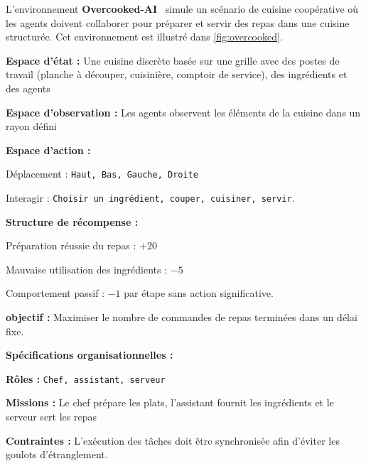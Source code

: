 L'environnement \textbf{Overcooked-AI}~\cite{Carroll2019} simule un scénario de cuisine coopérative où les agents doivent collaborer pour préparer et servir des repas dans une cuisine structurée. Cet environnement est illustré dans \autoref{fig:overcooked}.

\begin{enumerate*}[label={\roman*)}, itemjoin={; \quad}]
    \item \textbf{Espace d'état :} Une cuisine discrète basée sur une grille avec des postes de travail (planche à découper, cuisinière, comptoir de service), des ingrédients et des agents
    \item \textbf{Espace d'observation :} Les agents observent les éléments de la cuisine dans un rayon défini
    \item \textbf{Espace d'action :}
    \begin{enumerate*}[label={\roman*)}, itemjoin={; \quad}]
        \item Déplacement : \texttt{Haut, Bas, Gauche, Droite}
        \item Interagir : \texttt{Choisir un ingrédient, couper, cuisiner, servir}.
    \end{enumerate*}
    \item \textbf{Structure de récompense :}
    \begin{enumerate*}[label={\roman*)}, itemjoin={; \quad}]
        \item Préparation réussie du repas : $+20$
        \item Mauvaise utilisation des ingrédients : $-5$
        \item Comportement passif : $-1$ par étape sans action significative.
    \end{enumerate*}
    \item \textbf{objectif :} Maximiser le nombre de commandes de repas terminées dans un délai fixe.
\end{enumerate*}
%
\textbf{Spécifications organisationnelles :}
\begin{enumerate*}[label={\roman*)}, itemjoin={; \quad}]
    \item \textbf{Rôles :} \texttt{Chef, assistant, serveur}
    \item \textbf{Missions :} Le chef prépare les plats, l'assistant fournit les ingrédients et le serveur sert les repas
    \item \textbf{Contraintes :} L'exécution des tâches doit être synchronisée afin d'éviter les goulots d'étranglement.
\end{enumerate*}

